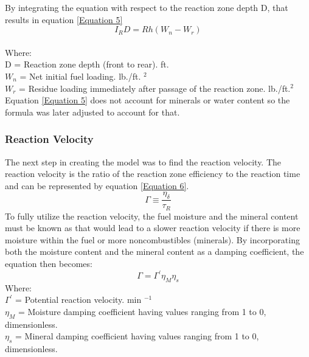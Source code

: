 \documentclass{article}
\begin{document}
\indent By integrating the equation with respect to the reaction zone depth D, that results in equation \ref{Equation 5}
\begin{equation}
	\label{Equation 5}
	I_R D = Rh (W_n - W_r)
\end{equation}\\
Where: \\
D = Reaction zone depth (front to rear). ft. \\
$W_n$ = Net initial fuel loading. lb./ft. $^2$ \\
$W_r$ = Residue loading immediately after passage of the reaction zone. lb./ft.$^2$ \\
\indent Equation \ref{Equation 5} does not account for minerals or water content so the formula was later adjusted to account for that. \\
\subsubsection{Reaction Velocity}
\indent The next step in creating the model was to find the reaction velocity. The reaction velocity is the ratio of the reaction zone efficiency to the reaction time and can be represented by equation \ref{Equation 6}.
\begin{equation}
	\label{Equation 6}
	\Gamma \equiv \frac {\eta _ \delta} {\tau _ R}
\end{equation}
\indent To fully utilize the reaction velocity, the fuel moisture and the mineral content must be known as that would lead to a slower reaction velocity if there is more moisture within the fuel or more noncombustibles (minerals). By incorporating both the moisture content and the mineral content as a damping coefficient, the equation then becomes: 
\begin{equation}
	\label{Equation 7}
	\Gamma = \Gamma ^ {'} \eta _ M \eta _ s
\end{equation}
Where: \\
 $\Gamma ^ {'}$ = Potential reaction velocity. min $^ {-1}$ \\ 
 $\eta _ M$ = Moisture damping coefficient having values ranging from 1 to 0, dimensionless. \\
 $\eta _ s$ = Mineral damping coefficient having values ranging from 1 to 0, dimensionless. \\
\end{document}
